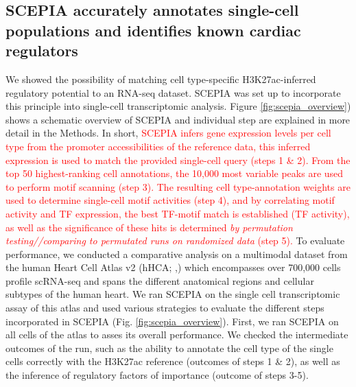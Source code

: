 \subsection{SCEPIA accurately annotates single-cell populations and identifies known cardiac regulators}

We showed the possibility of matching cell type-specific H3K27ac-inferred regulatory potential to an RNA-seq dataset. SCEPIA was set up to incorporate this principle into single-cell transcriptomic analysis. Figure \ref{fig:scepia_overview}) shows a schematic overview of SCEPIA and individual step are explained in more detail in the Methods. In short, \textcolor{red}{SCEPIA infers gene expression levels per cell type from the promoter accessibilities of the reference data, this inferred expression is used to match the provided single-cell query (steps 1 \& 2). From the top 50 highest-ranking cell annotations, the 10,000 most variable peaks are used to perform motif scanning (step 3). The resulting cell type-annotation weights are used to determine single-cell motif activities (step 4), and by correlating motif activity and TF expression, the best TF-motif match is established (TF activity), as well as the significance of these hits is determined \textit{by permutation testing//comparing to permutated runs on randomized data} (step 5).} To evaluate performance, we conducted a comparative analysis on a multimodal dataset from the human Heart Cell Atlas v2 (hHCA; \cite{Kanemaru2023},) which encompasses over 700,000 cells profile scRNA-seq and spans the different anatomical regions and cellular subtypes of the human heart. We ran SCEPIA on the single cell transcriptomic assay of this atlas and used various strategies to evaluate the different steps incorporated in SCEPIA (Fig. \ref{fig:scepia_overview}). First, we ran SCEPIA on all cells of the atlas to asses its overall performance. We checked the intermediate outcomes of the run, such as the ability to annotate the cell type of the single cells correctly with the H3K27ac reference (outcomes of steps 1 \& 2), as well as the inference of regulatory factors of importance (outcome of steps 3-5). 


